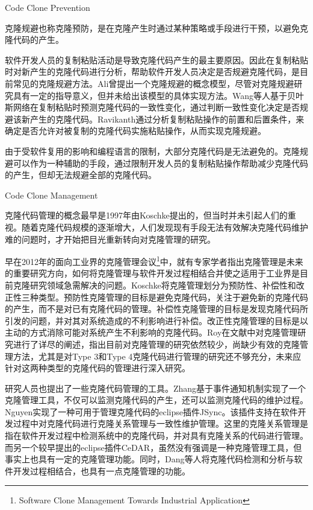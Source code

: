{Code Clone Prevention}

克隆规避也称克隆预防，是在克隆产生时通过某种策略或手段进行干预，以避免克隆代码的产生。

软件开发人员的复制粘贴活动是导致克隆代码产生的最主要原因。因此在复制粘贴时对新产生的克隆代码进行分析，帮助软件开发人员决定是否规避克隆代码，是目前常见的克隆规避方法。Ali曾提出一个克隆规避的概念模型\cite{ali2013enhancing}，尽管对克隆规避研究具有一定的指导意义，但并未给出该模型的具体实现方法。Wang等人基于贝叶斯网络在复制粘贴时预测克隆代码的一致性变化，通过判断一致性变化决定是否规避该新产生的克隆代码\cite{wang2012can}。Ravikanth通过分析复制粘贴操作的前置和后置条件，来确定是否允许对被复制的克隆代码实施粘贴操作，从而实现克隆规避\cite{venkatasubramanyam2012method}。

由于受软件复用的影响和编程语言的限制，大部分克隆代码是无法避免的。克隆规避可以作为一种辅助的手段，通过限制开发人员的复制粘贴操作帮助减少克隆代码的产生，但却无法规避全部的克隆代码。


{Code Clone Management}

克隆代码管理的概念最早是1997年由Koschke提出的\cite{koschke2008frontiers}，但当时并未引起人们的重视。随着克隆代码规模的逐渐增大，人们发现现有手段无法有效解决克隆代码维护难的问题时，才开始把目光重新转向对克隆管理的研究。

早在2012年的面向工业界的克隆管理会议\footnote{Software Clone Management Towards Industrial Application}中，就有专家学者指出克隆管理是未来的重要研究方向，如何将克隆管理与软件开发过程相结合并使之适用于工业界是目前克隆研究领域急需解决的问题\cite{koschke2012software}。Koschke将克隆管理划分为预防性、补偿性和改正性三种类型\cite{koschke2008frontiers}。预防性克隆管理的目标是避免克隆代码，关注于避免新的克隆代码的产生，而不是对已有克隆代码的管理。补偿性克隆管理的目标是发现克隆代码所引发的问题，并对其对系统造成的不利影响进行补偿。改正性克隆管理的目标是以主动的方式消除可能对系统产生不利影响的克隆代码。Roy在文献\cite{roy2014vision}中对克隆管理研究进行了详尽的阐述，指出目前对克隆管理的研究依然较少，尚缺少有效的克隆管理方法，尤其是对Type 3和Type 4克隆代码进行管理的研究还不够充分，未来应针对这两种类型的克隆代码的管理进行深入研究。

研究人员也提出了一些克隆代码管理的工具。Zhang基于事件通知机制实现了一个克隆管理工具，不仅可以监测克隆代码的产生，还可以监测克隆代码的维护过程\cite{zhang2013towards}。Nguyen实现了一种可用于管理克隆代码的eclipse插件JSync\cite{nguyen2012clone}。该插件支持在软件开发过程中对克隆代码进行克隆关系管理与一致性维护管理。这里的克隆关系管理是指在软件开发过程中检测系统中的克隆代码，并对具有克隆关系的代码进行管理。而另一个较早提出的eclipse插件CeDAR\cite{tairas2012increasing}，虽然没有强调是一种克隆管理工具，但事实上也具有一定的克隆管理功能。同时，Dang等人将克隆代码检测和分析与软件开发过程相结合，也具有一点克隆管理的功能\cite{dang2017transferring}。

